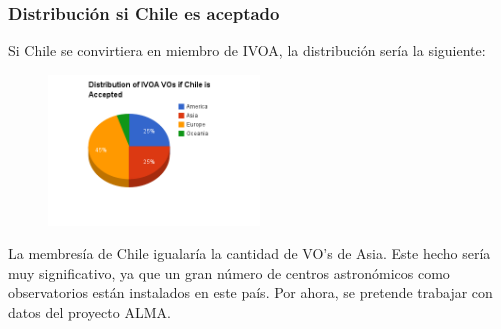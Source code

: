 \newpage

\begin{frame}
\frametitle{Distribución si Chile es aceptado}
Si Chile se convirtiera en miembro de IVOA, la distribución sería la siguiente:
\newline

\begin{multicols}{2}
\begin{figure}[h!t]
    \begin{center}
       \includegraphics[width=0.5\textwidth]{img/if_chile_is_accepted.png}
    \end{center}
\end{figure}

La membresía de Chile igualaría la cantidad de VO's de Asia.  Este hecho
sería muy significativo, ya que un gran número de centros astronómicos como
observatorios están instalados en este país. Por ahora, se pretende trabajar
con datos del proyecto ALMA.
\end{multicols}

\end{frame}
